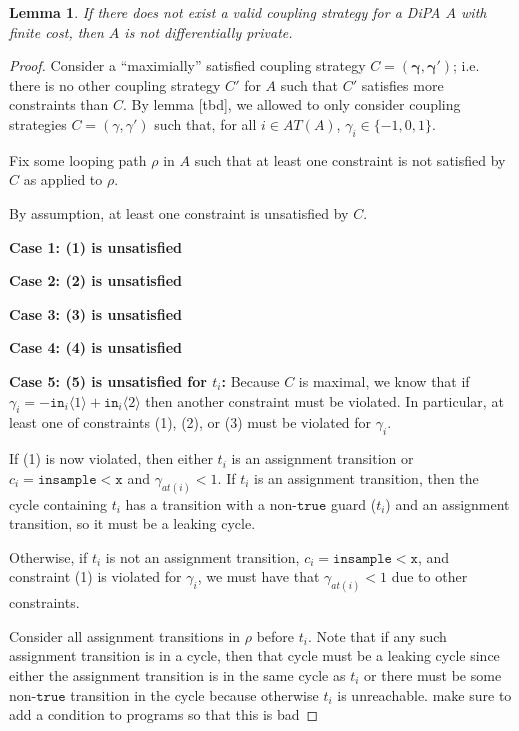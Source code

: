\documentclass[12pt]{article}
\newcommand{\lguard}[1][x]{\texttt{insample} < #1}
\newcommand{\brangle}[1]{\langle #1 \rangle}
\newtheorem{lemma}[thm]{Lemma}
\theoremstyle{definition}
\begin{document}
\begin{lemma}
    If there does not exist a valid coupling strategy for a DiPA $A$ with finite cost, then $A$ is not differentially private. 
\end{lemma}
\begin{proof}
    Consider a ``maximially'' satisfied coupling strategy $C=(\mathbf{\gamma}, \mathbf{\gamma}')$; i.e. there is no other coupling strategy $C'$ for $A$ such that $C'$ satisfies more constraints than $C$. By lemma [tbd], we allowed to only consider coupling strategies $C=(\gamma, \gamma')$ such that, for all $i\in AT(A)$, $\gamma_i \in \{-1, 0, 1\}$. 

    Fix some looping path $\rho$ in $A$ such that at least one constraint is not satisfied by $C$ as applied to $\rho$.

    By assumption, at least one constraint is unsatisfied by $C$.

    \textbf{Case 1: (1) is unsatisfied}

    \textbf{Case 2: (2) is unsatisfied}

    \textbf{Case 3: (3) is unsatisfied}

    \textbf{Case 4: (4) is unsatisfied}
    
    \textbf{Case 5: (5) is unsatisfied for $t_i$:} Because $C$ is maximal, we know that if $\gamma_i = -\texttt{in}_i\brangle{1}+\texttt{in}_i\brangle{2}$ then another constraint must be violated. In particular, at least one of constraints (1), (2), or (3) must be violated for $\gamma_i$. 

    If (1) is now violated, then either $t_i$ is an assignment transition or $c_i = \lguard[\texttt{x}]$ and $\gamma_{at(i)}<1$. If $t_i$ is an assignment transition, then the cycle containing $t_i$ has a transition with a non-$\texttt{true}$ guard ($t_i$) and an assignment transition, so it must be a leaking cycle. 

    Otherwise, if $t_i$ is not an assignment transition, $c_i = \lguard[\texttt{x}]$, and constraint (1) is violated for $\gamma_i$, we must have that $\gamma_{at(i)}<1$ due to other constraints.
    
    Consider all assignment transitions in $\rho$ before $t_i$. Note that if any such assignment transition is in a cycle, then that cycle must be a leaking cycle since either the assignment transition is in the same cycle as $t_i$ or there must be some non-$\texttt{true}$ transition in the cycle because otherwise $t_i$ is unreachable. {\color{red} make sure to add a condition to programs so that this is bad}


\end{proof}
\end{document}
